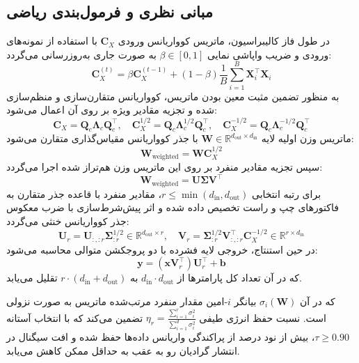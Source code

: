 \subsection{مبانی نظری و فرمول‌بندی ریاضی}
در طول فاز کالیبراسیون، ماتریس کوواریانس ورودی $\mathbf{C}_X$ با استفاده از نمونه‌های ورودی و ضریب واپاشی نمایی $\beta \in [0, 1]$ به صورت جاری به‌روزرسانی می‌گردد:
\begin{equation}
\mathbf{C}_X^{(t)} = \beta \mathbf{C}_X^{(t-1)} + (1 - \beta) \frac{1}{B} \sum_{i=1}^B \mathbf{X}_i^\top \mathbf{X}_i
\end{equation}
به منظور تضمین مثبت معین بودن ماتریس، کوواریانس متقارن‌سازی و منظم‌سازی شده و تجزیه مقادیر ویژه بر روی آن اعمال می‌شود:
\begin{equation}
\mathbf{C}_X = \mathbf{Q}_c \mathbf{\Lambda}_c \mathbf{Q}_c^\top, \quad \mathbf{C}_X^{1/2} = \mathbf{Q}_c \mathbf{\Lambda}_c^{1/2} \mathbf{Q}_c^\top, \quad \mathbf{C}_X^{-1/2} = \mathbf{Q}_c \mathbf{\Lambda}_c^{-1/2} \mathbf{Q}_c^\top
\end{equation}
ماتریس وزن اولیه لایه $\mathbf{W} \in \mathbb{R}^{d_{\text{out}} \times d_{\text{in}}}$ با جذر کوواریانس مقیاس‌گذاری متقارن می‌شود:
\begin{equation}
\mathbf{W}_{\text{weighted}} = \mathbf{W} \mathbf{C}_X^{1/2}
\end{equation}
سپس تجزیه مقادیر منفرد بر روی این ماتریس وزن هم‌تراز شده اجرا می‌گردد:
\begin{equation}
\mathbf{W}_{\text{weighted}} = \mathbf{U} \mathbf{\Sigma} \mathbf{V}^\top
\end{equation}
برای رتبه انتخابی $r \le \min(d_{\text{in}}, d_{\text{out}})$، مقادیر منفرد با قاعده جذر متقارن به فاکتورهای چپ و راست تخصیص داده شده و اثر پیش‌شرط‌سازی با ضرب معکوس جذر کوواریانس خنثی می‌گردد:
\begin{equation}
\mathbf{U}_r = \mathbf{U}_{:, :r} \mathbf{\Sigma}_{:r}^{1/2} \in \mathbb{R}^{d_{\text{out}} \times r}, \quad \mathbf{V}_r = \mathbf{\Sigma}_{:r}^{1/2} \mathbf{V}_{:, :r}^\top \mathbf{C}_X^{-1/2} \in \mathbb{R}^{r \times d_{\text{in}}}
\end{equation}
در حین استنتاج، خروجی لایه فشرده با دو پروجکشن متوالی محاسبه می‌شود:
\begin{equation}
\mathbf{y} = (\mathbf{x} \mathbf{V}_r^\top) \mathbf{U}_r^\top + \mathbf{b}
\end{equation}
که در آن تعداد کل پارامترها از $d_{\text{in}} \cdot d_{\text{out}}$ به $r \cdot (d_{\text{in}} + d_{\text{out}})$ تقلیل می‌یابد.

که در آن $\sigma_i(\mathbf{W})$ بیانگر $i$-امین مقدار منفرد مرتب‌شده ماتریس به صورت نزولی است. نسبت حفظ انرژی طیفی $\eta_r = \frac{\sum_{i=1}^r \sigma_i^2}{\sum_{i=1}^{d} \sigma_i^2}$ تضمین می‌کند که با انتخاب آستانه $\tau \ge 0.90$، بیش از نود درصد از پراکندگی واریانس داده‌ها حفظ شده و افت سیگنال در انتشار گرادیان رو به عقب به حداقل ممکن کاهش می‌یابد.

